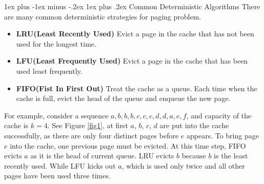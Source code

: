 \documentclass[11pt]{article}
\makeatletter
\renewcommand{\subsection}{\@startsection{subsection}{2}{0mm}%
                                   {1ex plus -1ex minus -.2ex}%
                                   {1ex plus .2ex}%
                                   {\normalfont\large\bfseries}}%
\makeatother
\begin{document}
\subsection{Common Deterministic Algorithms}
There are many common deterministic strategies for paging problem.
\begin{itemize}
	\item {\bf LRU(Least Recently Used)} Evict a page in the cache that has not been used for the longest time.
	\item {\bf LFU(Least Frequently Used)} Evict a page in the cache that has been used least frequently.
	\item {\bf FIFO(Fist In First Out)} Treat the cache as a queue. Each time when the cache is full, evict the head of the queue and enqueue the new page.
\end{itemize}
For example, consider a sequence $a, b, b, b, c, c, c, d, d, a, e, f$, and capacity of the cache is $k=4$. See Figure \ref{fig1}, at first $a$, $b$, $c$, $d$ are put into the cache successfully, as there are only four distinct pages before $e$ appears. To bring page $e$ into the cache, one previous page must be evicted. At this time step, FIFO evicts $a$ as it is the head of current queue. LRU evicts $b$ because $b$ is the least recently used. While LFU kicks out $a$, which is used only twice and all other pages have been used three times.
\end{document}
